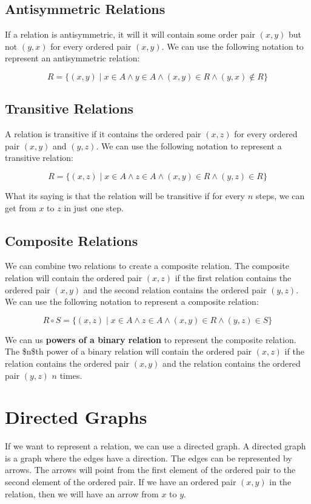 \documentclass[11pt]{article}
\begin{document}
\subsection{Antisymmetric Relations}
\label{sec:orgcb4bb64}
If a relation is antisymmetric, it will it will contain some order pair \((x,y)\) but not \((y,x)\) for every ordered pair \((x,y)\). We can use the following notation to represent an antisymmetric relation:

\[
R = \{(x, y) \mid x \in A \land y \in A \land (x, y) \in R \land (y, x) \notin R\}
\]

\subsection{Transitive Relations}
\label{sec:org82d5332}
A relation is transitive if it contains the ordered pair \((x, z)\) for every ordered pair \((x, y)\) and \((y, z)\). We can use the following notation to represent a transitive relation:

\[
R = \{(x, z) \mid x \in A \land z \in A \land (x, y) \in R \land (y, z) \in R\}
\]

What its saying is that the relation will be transitive if for every \(n\) steps, we can get from \(x\) to \(z\) in just one step.

\subsection{Composite Relations}
\label{sec:org664c4d2}
We can combine two relations to create a composite relation. The composite relation will contain the ordered pair \((x, z)\) if the first relation contains the ordered pair \((x, y)\) and the second relation contains the ordered pair \((y, z)\). We can use the following notation to represent a composite relation:

\[
R \circ S = \{(x, z) \mid x \in A \land z \in A \land (x, y) \in R \land (y, z) \in S\}
\]

We can us \textbf{powers of a binary relation} to represent the composite relation. The \$n\$th power of a binary relation will contain the ordered pair \((x, z)\) if the relation contains the ordered pair \((x, y)\) and the relation contains the ordered pair \((y, z)\) \(n\) times.

\section{Directed Graphs}
\label{sec:orge538cba}
If we want to represent a relation, we can use a directed graph. A directed graph is a graph where the edges have a direction. The edges can be represented by arrows. The arrows will point from the first element of the ordered pair to the second element of the ordered pair. If we have an ordered pair \((x, y)\) in the relation, then we will have an arrow from \(x\) to \(y\).
\end{document}
